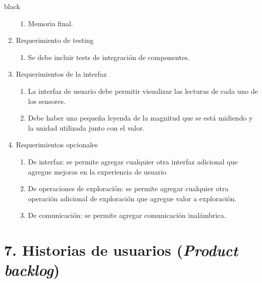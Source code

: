 \documentclass[
11pt, %
]{charter}
\begin{document}
\begin{consigna}{black}
\begin{enumerate}
\begin{enumerate}
			\item Memoria final.	
		\end{enumerate}	
	\item Requerimiento de testing		
		\begin{enumerate}			
			\item Se debe incluir tests de integración de componentes.		
		\end{enumerate}	
	\item Requerimientos de la interfaz		
		\begin{enumerate}			
			\item La interfaz de usuario debe permitir visualizar las lecturas de cada uno de los sensores.			
			\item Debe haber una pequeña leyenda de la magnitud que se está midiendo y la unidad utilizada junto con el valor.		
		\end{enumerate}	
	\item Requerimientos opcionales		
		\begin{enumerate}			
			\item De interfaz: se permite agregar cualquier otra interfaz adicional que agregue mejoras en la experiencia de usuario			
			\item De operaciones de exploración: se permite agregar cualquier otra operación adicional de exploración que agregue valor a exploración.	
			\item De comunicación: se permite agregar comunicación inalámbrica.		
	\end{enumerate}
\end{enumerate}




\end{consigna}

\section{7. Historias de usuarios (\textit{Product backlog})}
\label{sec:backlog}
\end{document}
